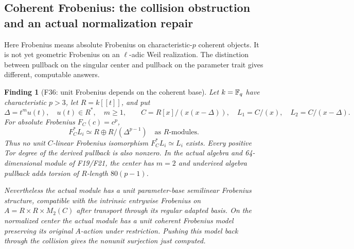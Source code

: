 \documentclass[11pt,a4paper]{article}
\newcommand{\fid}[1]{\textsf{#1}}\newcommand{\gate}[1]{\textsf{#1}}
\theoremstyle{named}\newtheorem{finding}{Finding}[section]
\theoremstyle{definition}\newtheorem{definition}[finding]{Definition}
\theoremstyle{remark}\newtheorem{remark}[finding]{Remark}
\begin{document}
\subsection{Coherent Frobenius: the collision obstruction and an actual normalization repair}
Here Frobenius means absolute Frobenius on characteristic-$p$ coherent
objects. It is not yet geometric Frobenius on an $\ell$-adic Weil
realization. The distinction between pullback on the singular center
and pullback on the parameter trait gives different, computable answers.

\begin{finding}[\fid{F36}: unit Frobenius depends on the coherent base]\label{f:coherentfrobenius}
Let $k=\mathbb F_q$ have characteristic $p>3$, let $R=k[[t]]$, and put
\[
 \Delta=t^m u(t),\quad u(t)\in R^*,\quad m\ge1,\qquad
 C=R[x]/(x(x-\Delta)),\quad L_1=C/(x),\quad L_2=C/(x-\Delta).
\]
For absolute Frobenius $F_C(c)=c^p$,
\[
 F_C^*L_i\simeq R\oplus R/(\Delta^{p-1})
 \quad\text{as }R\text{-modules}.
\]
Thus no unit $C$-linear Frobenius isomorphism $F_C^*L_i\simeq L_i$
exists. Every positive Tor degree of the derived pullback is also
nonzero. In the actual algebra and 64-dimensional module of
\fid{F19}/\fid{F21}, the center has $m=2$ and underived algebra
pullback adds torsion of $R$-length $80(p-1)$.

Nevertheless the actual module has a unit \emph{parameter-base}
semilinear Frobenius structure, compatible with the intrinsic
entrywise Frobenius on $A=R\times R\times M_2(C)$ after transport
through its regular adapted basis. On the normalized center the
actual module has a unit coherent Frobenius model preserving its
original $A$-action under restriction. Pushing this model back through
the collision gives the nonunit surjection just computed.
\end{finding}
\end{document}
